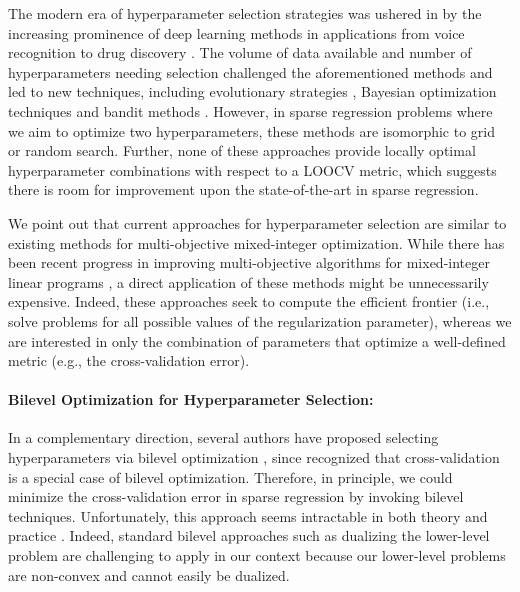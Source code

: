 \documentclass[ijoc,noblindrev]{informs3} %
\newcommand{\ag}[1]{{\color{black}#1}}
\begin{document}
The modern era of hyperparameter selection strategies was ushered in by the increasing prominence of deep learning methods in applications from voice recognition to drug discovery \citep[see][for a review]{lecun2015deep}. 
The volume of data available and number of hyperparameters needing selection challenged the aforementioned methods and led to new techniques, including evolutionary strategies%
, Bayesian optimization techniques \citep{ frazier2018tutorial} and bandit methods \cite{falkner2018bohb}. 
However, in sparse regression problems where we aim to optimize two hyperparameters, these methods are isomorphic to grid or random search. Further, none of these approaches provide locally optimal hyperparameter combinations with respect to a LOOCV metric, which suggests there is room for improvement upon the state-of-the-art in sparse regression. 

{We point out that current approaches for hyperparameter selection are similar to existing methods for multi-objective mixed-integer optimization. While there has been recent progress in improving multi-objective algorithms for mixed-integer linear programs \citep{lokman2013finding,stidsen2014branch}, %
a direct application of these methods might be unnecessarily expensive. Indeed, these approaches seek to compute the efficient frontier \citep{boland2015criterion,boland2015criterion2} (i.e., solve problems for all possible values of the regularization parameter), whereas we are interested in only the combination of parameters that optimize a well-defined metric (e.g., \ag{\color{black}the cross-validation error}). %
}




\paragraph{Bilevel Optimization for Hyperparameter Selection:} In a complementary direction, several authors have proposed selecting hyperparameters via bilevel optimization \citep[see][for a general theory]{beck2021gentle}, since \cite{bennett2006model} %
recognized that cross-validation is a special case of bilevel optimization. 
Therefore, {\color{black}in principle, we could} minimize the {\color{black}cross-validation} error in sparse regression by invoking bilevel techniques. Unfortunately, this approach seems intractable in both theory and practice \citep[][]{ben1990computational, hansen1992new}. Indeed, standard bilevel approaches such as dualizing the lower-level problem are challenging to apply in our context because our lower-level problems are non-convex and cannot easily be dualized.
\end{document}
